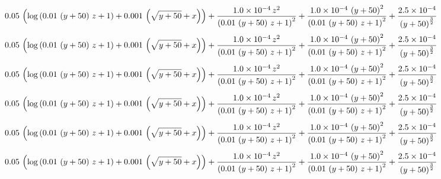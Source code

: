 $$0.05\,\left(\log \left(0.01\,\left(y+50\right)\,z+1\right)+0.001\,
 \left(\sqrt{y+50}+x\right)\right)+{{1.0 \times 10^{-4}\,z^2}\over{
 \left(0.01\,\left(y+50\right)\,z+1\right)^2}}+{{1.0 \times 10^{-4}\,
 \left(y+50\right)^2}\over{\left(0.01\,\left(y+50\right)\,z+1\right)^
 2}}+{{2.5 \times 10^{-4}}\over{\left(y+50\right)^{{{3}\over{2}}}}}$$
$$0.05\,\left(\log \left(0.01\,\left(y+50\right)\,z+1\right)+0.001\,
 \left(\sqrt{y+50}+x\right)\right)+{{1.0 \times 10^{-4}\,z^2}\over{
 \left(0.01\,\left(y+50\right)\,z+1\right)^2}}+{{1.0 \times 10^{-4}\,
 \left(y+50\right)^2}\over{\left(0.01\,\left(y+50\right)\,z+1\right)^
 2}}+{{2.5 \times 10^{-4}}\over{\left(y+50\right)^{{{3}\over{2}}}}}$$
$$0.05\,\left(\log \left(0.01\,\left(y+50\right)\,z+1\right)+0.001\,
 \left(\sqrt{y+50}+x\right)\right)+{{1.0 \times 10^{-4}\,z^2}\over{
 \left(0.01\,\left(y+50\right)\,z+1\right)^2}}+{{1.0 \times 10^{-4}\,
 \left(y+50\right)^2}\over{\left(0.01\,\left(y+50\right)\,z+1\right)^
 2}}+{{2.5 \times 10^{-4}}\over{\left(y+50\right)^{{{3}\over{2}}}}}$$
$$0.05\,\left(\log \left(0.01\,\left(y+50\right)\,z+1\right)+0.001\,
 \left(\sqrt{y+50}+x\right)\right)+{{1.0 \times 10^{-4}\,z^2}\over{
 \left(0.01\,\left(y+50\right)\,z+1\right)^2}}+{{1.0 \times 10^{-4}\,
 \left(y+50\right)^2}\over{\left(0.01\,\left(y+50\right)\,z+1\right)^
 2}}+{{2.5 \times 10^{-4}}\over{\left(y+50\right)^{{{3}\over{2}}}}}$$
$$0.05\,\left(\log \left(0.01\,\left(y+50\right)\,z+1\right)+0.001\,
 \left(\sqrt{y+50}+x\right)\right)+{{1.0 \times 10^{-4}\,z^2}\over{
 \left(0.01\,\left(y+50\right)\,z+1\right)^2}}+{{1.0 \times 10^{-4}\,
 \left(y+50\right)^2}\over{\left(0.01\,\left(y+50\right)\,z+1\right)^
 2}}+{{2.5 \times 10^{-4}}\over{\left(y+50\right)^{{{3}\over{2}}}}}$$
$$0.05\,\left(\log \left(0.01\,\left(y+50\right)\,z+1\right)+0.001\,
 \left(\sqrt{y+50}+x\right)\right)+{{1.0 \times 10^{-4}\,z^2}\over{
 \left(0.01\,\left(y+50\right)\,z+1\right)^2}}+{{1.0 \times 10^{-4}\,
 \left(y+50\right)^2}\over{\left(0.01\,\left(y+50\right)\,z+1\right)^
 2}}+{{2.5 \times 10^{-4}}\over{\left(y+50\right)^{{{3}\over{2}}}}}$$

